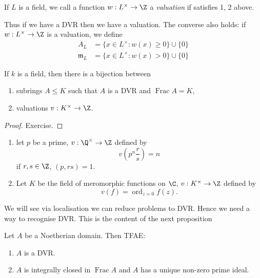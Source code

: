 \documentclass[a4paper]{article}
\theoremstyle{definition}
\DeclareMathOperator{\Frac}{Frac}
\begin{document}
\begin{definition}[valuation]
  If \(L\) is a field, we call a function \(w: L^\times \to \Z\) a \emph{valuation} if satisfies 1, 2 above.
\end{definition}

Thus if we have a DVR then we have a valuation. The converse also holds: if \(w: L^\times \to \Z\) is a valuation, we define
\begin{align*}
  A_L &= \{x \in L^\times: w(x) \geq 0\} \cup \{0\} \\
  \mathfrak m_L &= \{x \in L^\times: w(x) > 0\} \cup \{0\}
\end{align*}

\begin{lemma}
  If \(k\) is a field, then there is a bijection between
  \begin{enumerate}
  \item subrings \(A \leq K\) such that \(A\) is a DVR and \(\Frac A = K\),
  \item valuations \(v: K^\times \to \Z\).
  \end{enumerate}
\end{lemma}

\begin{proof}
  Exercise.
\end{proof}

\begin{eg}\leavevmode
  \begin{enumerate}
  \item let \(p\) be a prime, \(v: \Q^\times \to \Z\) defined by
    \[
      v(p^n \frac{r}{s}) = n
    \]
    if \(r, s \in \Z\), \((p, rs) = 1\).
  \item Let \(K\) be the field of meromorphic functions on \(\C\), \(v: K^\times \to \Z\) defined by
    \[
      v(f) = \operatorname{ord}_{z = 0} f(z).
    \]
  \end{enumerate}
\end{eg}

We will see via localisation we can reduce problems to DVR. Hence we need a way to recognise DVR. This is the content of the next proposition

\begin{proposition}
  Let \(A\) be a Noetherian domain. Then TFAE:
  \begin{enumerate}
  \item \(A\) is a DVR.
  \item \(A\) is integrally closed in \(\Frac A\) and \(A\) has a unique non-zero prime ideal.
  \end{enumerate}
\end{proposition}
\end{document}
